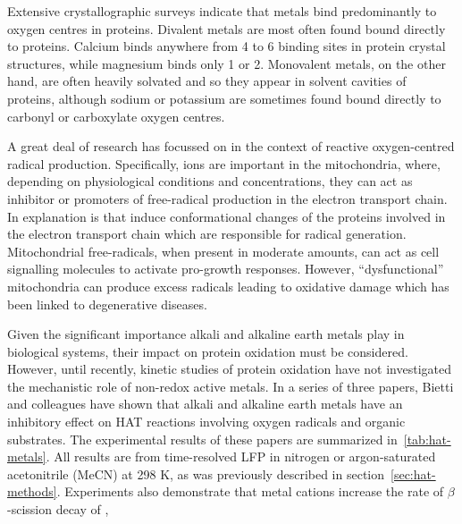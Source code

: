 Extensive crystallographic surveys indicate that metals bind predominantly to oxygen centres in proteins.\cite{Harding1999, Harding2001, Hsin2006} Divalent metals are most often found bound directly to proteins. Calcium binds anywhere from 4 to 6 binding sites in protein crystal structures, while magnesium binds only 1 or 2. Monovalent metals, on the other hand, are often heavily solvated and so they appear in solvent cavities of proteins, although sodium or potassium are sometimes found bound directly to carbonyl or carboxylate oxygen centres.\cite{Harding2010}

A great deal of research has focussed on  in the context of reactive oxygen-centred radical production.\cite{Goerlach2015} Specifically,  ions are important in the mitochondria, where, depending on physiological conditions and concentrations, they can act as inhibitor or promoters of free-radical production in the electron transport chain.\cite{AdamVizi2010} In explanation is that  induce conformational changes of the proteins involved in the electron transport chain which are responsible for radical generation.\cite{Brookes2004} Mitochondrial free-radicals, when present in moderate amounts, can act as cell signalling molecules to activate pro-growth responses.\cite{Sullivan2014} However, ``dysfunctional'' mitochondria can produce excess radicals leading to oxidative damage which has been linked to degenerative diseases.

Given the significant importance alkali and alkaline earth metals play in biological systems, their impact on protein oxidation must be considered. However, until recently, kinetic studies of protein oxidation have not investigated the mechanistic role of non-redox active metals. In a series of three papers,\cite{Salamone2013a, Salamone2015metals, Salamone2016} Bietti and colleagues have shown that alkali and alkaline earth metals have an inhibitory effect on HAT reactions involving oxygen radicals and organic substrates. The experimental results of these papers are summarized in~\ref{tab:hat-metals}. All results are from time-resolved LFP in nitrogen or argon-saturated acetonitrile (MeCN) at 298 K, as was previously described in section~\ref{sec:hat-methods}. Experiments also demonstrate that metal cations increase the rate of $\beta$-scission decay of \cumo,

